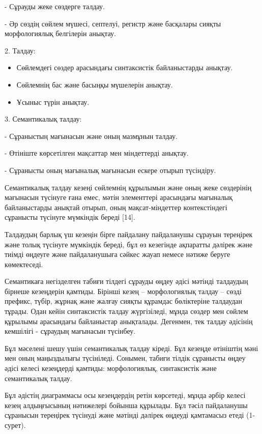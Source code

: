 - Сұрауды жеке сөздерге талдау.

- Әр сөздің сөйлем мүшесі, септелуі, регистр және басқалары сияқты
морфологиялық белгілерін анықтау.

2. Талдау:

\begin{itemize}
\item
  Сөйлемдегі сөздер арасындағы синтаксистік байланыстарды анықтау.
\item
  Сөйлемнің бас және басыңқы мүшелерін анықтау.
\item
  Ұсыныс түрін анықтау.
\end{itemize}

3. Семантикалық талдау:

- Сұраныстың мағынасын және оның мазмұнын талдау.

- Өтініште көрсетілген мақсаттар мен міндеттерді анықтау.

- Сұранысты оның мағыналық мағынасын ескере отырып түсіндіру.

Семантикалық талдау кезеңі сөйлемнің құрылымын және оның жеке сөздерінің
мағынасын түсінуге ғана емес, мәтін элементтері арасындағы мағыналық
байланыстарды анықтай отырып, оның мақсат-міндеттер контекстіндегі
сұранысты түсінуге мүмкіндік береді {[}14{]}.

Талдаудың барлық үш кезеңін бірге пайдалану пайдаланушы сұрауын
тереңірек және толық түсінуге мүмкіндік береді, бұл өз кезегінде
ақпаратты дәлірек және тиімді өңдеуге және пайдаланушыға сәйкес жауап
немесе нәтиже беруге көмектеседі.

Семантикаға негізделген табиғи тілдегі сұрауды өңдеу әдісі мәтінді
талдаудың бірнеше кезеңдерін қамтиды. Бірінші кезең -- морфологиялық
талдау -- сөзді префикс, түбір, жұрнақ және жалғау сияқты құрамдас
бөліктеріне талдаудан тұрады. Одан кейін синтаксистік талдау
жүргізіледі, мұнда сөздер мен сөйлем құрылымы арасындағы байланыстар
анықталады. Дегенмен, тек талдау әдісінің кемшілігі - сұраудың мағынасын
түсінбеу.

Бұл мәселені шешу үшін семантикалық талдау кіреді. Бұл кезеңде өтініштің
мәні мен оның маңыздылығы түсініледі. Сонымен, табиғи тілдік сұранысты
өңдеу әдісі келесі кезеңдерді қамтиды: морфологиялық, синтаксистік және
семантикалық талдау.

Бұл әдістің диаграммасы осы кезеңдердің ретін көрсетеді, мұнда әрбір
келесі кезең алдыңғысының нәтижелері бойынша құрылады. Бұл тәсіл
пайдаланушы сұранысын тереңірек түсінуді және мәтінді дәлірек өңдеуді
қамтамасыз етеді (1-сурет).

